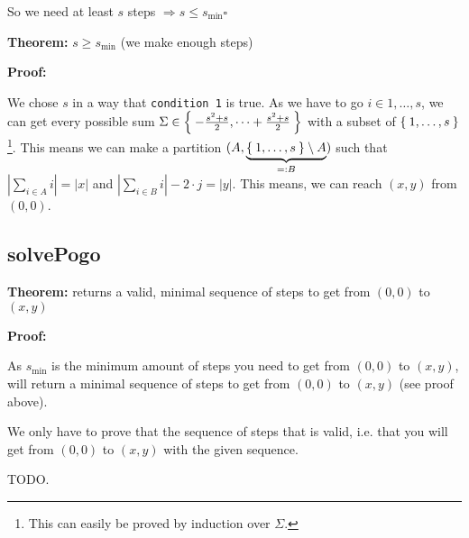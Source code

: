 \documentclass[a4paper]{scrartcl}
\newenvironment{myindentpar}[1]%
 {\begin{list}{}%
         {\setlength{\leftmargin}{#1}}%
         \item[]%
 }
 {\end{list}}
\begin{document}
\begin{myindentpar}{1cm}
\begin{myindentpar}{1cm}
So we need at least $s$ steps $\Rightarrow s \leq s_{\min} \square$
\end{myindentpar}

\textbf{Theorem: } $s \geq s_{\min}$ (we make enough steps)

\textbf{Proof: }
\begin{myindentpar}{1cm}
We chose $s$ in a way that \texttt{condition 1} is true.
As we have to go $i \in 1,\dots,s$, we can get every possible sum $\Sigma \in \Set{-\frac{s^2+s}{2}, \dots +\frac{s^2+s}{2}}$
with a subset of $\Set{1, \dots, s}$\footnote{This can easily be proved by induction over $\Sigma$.}.
This means we can make a partition $(A, \underbrace{\Set{1, \dots, s} \setminus A}_{=: B})$
such that $|\sum_{i \in A} i| = |x|$ and $|\sum_{i \in B} i|-2\cdot j = |y|$.
This means, we can reach $(x,y)$ from $(0,0)$.
\end{myindentpar}
\end{myindentpar}

\subsection{solvePogo}
\textbf{Theorem: }  returns a valid, minimal sequence of steps to get from $(0, 0)$ to $(x,y)$

\textbf{Proof: }
\begin{myindentpar}{1cm}
As $s_{\min}$ is the minimum amount of steps you need to get from
$(0,0)$ to $(x,y)$,  will return a minimal
sequence of steps to get from $(0, 0)$ to $(x,y)$ (see proof above).

We only have to prove that the sequence of steps that 
is valid, i.e. that you will get from $(0,0)$ to $(x,y)$ with the given
sequence.

TODO.
\end{myindentpar}
\end{document}
